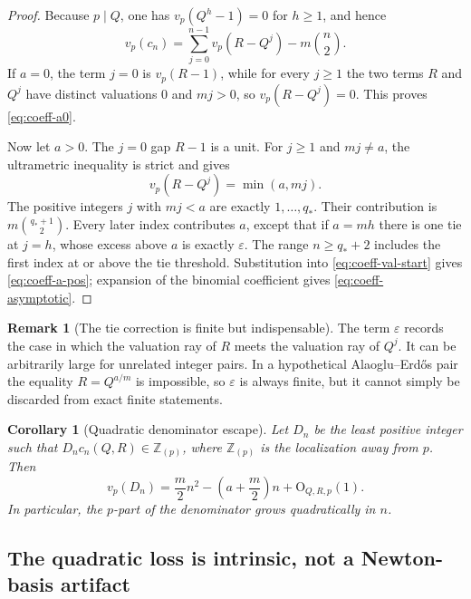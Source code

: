 \documentclass[11pt,oneside]{article}
\newtheorem{corollary}[theorem]{Corollary}
\theoremstyle{definition}
\newtheorem{remark}[theorem]{Remark}
\newcommand{\Z}{\mathbb Z}
\newcommand{\vp}{v_p}
\newcommand{\bigO}{\mathrm O}
\newcommand{\AEconj}{Alaoglu--Erd\H{o}s}
\begin{document}
\begin{proof}
Because $p\mid Q$, one has $\vp(Q^h-1)=0$ for $h\ge1$, and hence
\begin{equation}\label{eq:coeff-val-start}
 \vp(c_n)=\sum_{j=0}^{n-1}\vp(R-Q^j)-m\binom n2.
\end{equation}
If $a=0$, the term $j=0$ is $\vp(R-1)$, while for every $j\ge1$ the two terms $R$ and
$Q^j$ have distinct valuations $0$ and $mj>0$, so $\vp(R-Q^j)=0$.  This proves
\eqref{eq:coeff-a0}.

Now let $a>0$.  The $j=0$ gap $R-1$ is a unit.  For $j\ge1$ and $mj\ne a$, the
ultrametric inequality is strict and gives
\[
 \vp(R-Q^j)=\min(a,mj).
\]
The positive integers $j$ with $mj<a$ are exactly $1,\ldots,q_*$.  Their contribution is
$m\binom{q_*+1}{2}$.  Every later index contributes $a$, except that if $a=mh$ there is one
tie at $j=h$, whose excess above $a$ is exactly $\varepsilon$.  The range
$n\ge q_*+2$ includes the first index at or above the tie threshold.  Substitution into
\eqref{eq:coeff-val-start} gives \eqref{eq:coeff-a-pos}; expansion of the binomial coefficient
gives \eqref{eq:coeff-asymptotic}.
\end{proof}

\begin{remark}[The tie correction is finite but indispensable]
The term $\varepsilon$ records the case in which the valuation ray of $R$ meets the valuation
ray of $Q^j$.  It can be arbitrarily large for unrelated integer pairs.  In a hypothetical
\AEconj{} pair the equality $R=Q^{a/m}$ is impossible, so $\varepsilon$ is always finite, but it
cannot simply be discarded from exact finite statements.
\end{remark}

\begin{corollary}[Quadratic denominator escape]\label{cor:quadratic-denominator}
Let $D_n$ be the least positive integer such that $D_nc_n(Q,R)\in\Z_{(p)}$, where
$\Z_{(p)}$ is the localization away from $p$.  Then
\begin{equation}\label{eq:Dn-asymptotic}
 \vp(D_n)
 =\frac m2n^2-\left(a+\frac m2\right)n+\bigO_{Q,R,p}(1).
\end{equation}
In particular, the $p$-part of the denominator grows quadratically in $n$.
\end{corollary}

\subsection{The quadratic loss is intrinsic, not a Newton-basis artifact}
\end{document}
